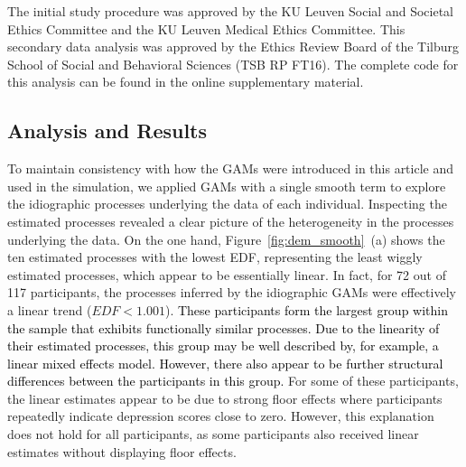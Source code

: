 \documentclass[man, floatsintext]{apa7}
\begin{document}
The initial study procedure was approved by the KU Leuven Social and Societal
Ethics Committee and the KU Leuven Medical Ethics Committee. This secondary
data analysis was approved by the Ethics Review Board of the Tilburg School of
Social and Behavioral Sciences (TSB RP FT16). The complete code for this
analysis can be found in the online supplementary material.

\subsection{Analysis and Results}

To maintain consistency with how the GAMs were introduced in this article and
used in the simulation, we applied GAMs with a single smooth term to explore
the idiographic processes underlying the data of each individual. Inspecting
the estimated processes revealed a clear picture of the heterogeneity in the
processes underlying the data. On the one hand, Figure~\ref{fig:dem_smooth}~(a)
shows the ten estimated processes with the lowest EDF, representing the least
wiggly estimated processes, which appear to be essentially linear. In fact, for
72 out of 117 participants, the processes inferred by the idiographic GAMs were
effectively a linear trend ($EDF < 1.001$). \textcolor{black}{ These
  participants form the largest group within the sample that exhibits
  functionally
  similar processes. Due to the linearity of their estimated processes, this
  group may be well described by, for example, a linear mixed effects model.
  However, there also appear to be further structural differences between the
  participants in this group.} For some of these participants, the linear
estimates appear to be due to strong floor effects where participants
repeatedly indicate depression scores close to zero. However, this explanation
does not hold for all participants, as some participants also received linear
estimates without displaying floor effects.
\end{document}
